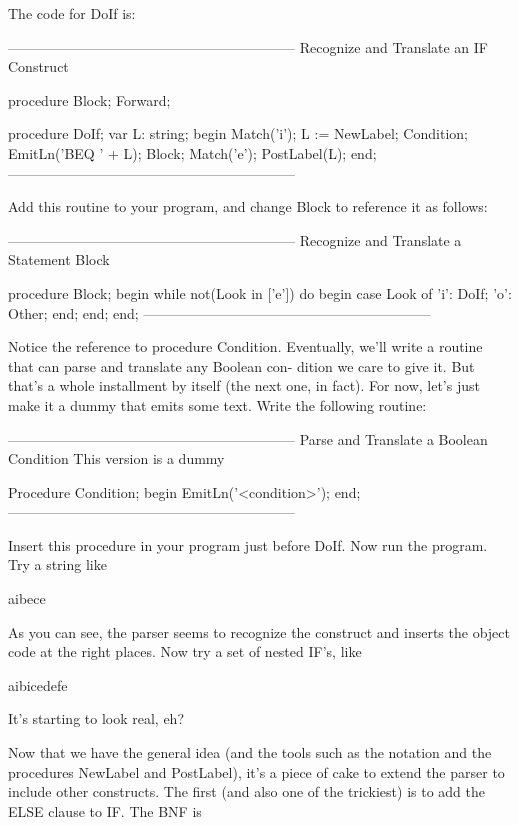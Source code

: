 \documentclass[float=false, crop=false]{standalone}
\begin{document}
The code for DoIf is:

\begin{code}
{--------------------------------------------------------------}
{ Recognize and Translate an IF Construct }

procedure Block; Forward;


procedure DoIf;
var L: string;
begin
   Match('i');
   L := NewLabel;
   Condition;
   EmitLn('BEQ ' + L);
   Block;
   Match('e');
   PostLabel(L);
end;
{--------------------------------------------------------------}
\end{code}

Add this routine to your program, and change Block to reference it as follows:

\begin{code}
{--------------------------------------------------------------}
{ Recognize and Translate a Statement Block }

procedure Block;
begin
   while not(Look in ['e']) do begin
      case Look of
       'i': DoIf;
       'o': Other;
      end;
   end;
end;
{--------------------------------------------------------------}
\end{code}

Notice the reference to procedure Condition. Eventually, we'll write a routine
that can parse and translate any Boolean con- dition we care to give it. But
that's a whole installment by itself (the next one, in fact). For now, let's
just make it a dummy that emits some text. Write the following routine:

\begin{code}
{--------------------------------------------------------------}
{ Parse and Translate a Boolean Condition }
{ This version is a dummy }

Procedure Condition;
begin
   EmitLn('<condition>');
end;
{--------------------------------------------------------------}
\end{code}

Insert this procedure in your program just before DoIf. Now run the program. Try
a string like

     aibece

As you can see, the parser seems to recognize the construct and inserts the
object code at the right places. Now try a set of nested IF's, like

     aibicedefe

It's starting to look real, eh?

Now that we have the general idea (and the tools such as the notation and the
procedures NewLabel and PostLabel), it's a piece of cake to extend the parser to
include other constructs. The first (and also one of the trickiest) is to add
the ELSE clause to IF. The BNF is
\end{document}
